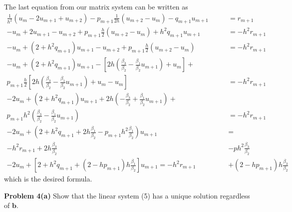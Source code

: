 \documentclass[12pt]{article}
\newcommand{\problem}[1]{\hspace{-4 ex} \large \textbf{Problem #1} }
\renewcommand{\vec}[1]{\boldsymbol{\mathbf{#1}}}
\begin{document}
The last equation from our matrix system can be written as
\begin{align*}
\frac{1}{h^2}(u_m -2u_{m+1} + u_{m+2}) - p_{m+1}\frac{1}{2h}(u_{m+2} - u_m) - q_{m+1}u_{m+1} &= r_{m+1} \\
-u_m +2u_{m+1} - u_{m+2} + p_{m+1}\frac{h}{2}(u_{m+2} - u_m) + h^2q_{m+1}u_{m+1} &= -h^2r_{m+1} \\
-u_m + (2 + h^2q_{m+1})u_{m+1} - u_{m+2} + p_{m+1}\frac{h}{2}(u_{m+2} - u_m) &= -h^2r_{m+1} \\
-u_m + (2 + h^2q_{m+1})u_{m+1} - \left[ 2h \left ( \frac{\beta_3}{\beta_2} - \frac{\beta_1}{\beta_2}u_{m+1} \right) + u_m \right] + \phantom{===}&\\  p_{m+1}\frac{h}{2} \left[ 2h \left ( \frac{\beta_3}{\beta_2} - \frac{\beta_1}{\beta_2}u_{m+1} \right) + u_m - u_m \right] &= -h^2r_{m+1} \\
-2u_m + (2 + h^2q_{m+1})u_{m+1} + 2h \left ( -\frac{\beta_3}{\beta_2} + \frac{\beta_1}{\beta_2}u_{m+1} \right) + \phantom{===}&\\ p_{m+1}h^2 \left ( \frac{\beta_3}{\beta_2} - \frac{\beta_1}{\beta_2}u_{m+1} \right) &= -h^2r_{m+1} \\
-2u_m + \left( 2 + h^2q_{m+1} + 2h\frac{\beta_1}{\beta_2}  - p_{m+1}h^2 \frac{\beta_1}{\beta_2} \right) u_{m+1} &= \\ -h^2r_{m+1} + 2h\frac{\beta_3}{\beta_2} &- ph^2 \frac{\beta_3}{\beta_2} \\
-2u_m + \left[ 2 + h^2q_{m+1} + (2 - hp_{m+1}) h\frac{\beta_1}{\beta_2} \right] u_{m+1} = -h^2r_{m+1} &+ (2 - hp_{m+1}) h \frac{\beta_3}{\beta_2}
\end{align*}
which is the desired formula.

\bigbreak
\problem{4(a)} Show that the linear system (5) has a unique solution regardless of $\vec{b}$. \bigbreak
\end{document}
